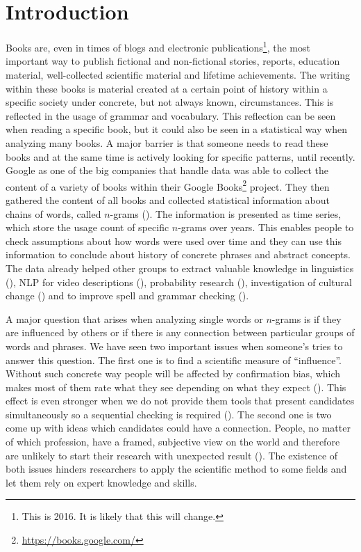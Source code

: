 \chapter{Introduction}
\label{ch:Introduction}

Books are, even in times of blogs and electronic publications\footnote{This is 2016. It is likely that this will change.}, the most important way to publish fictional and non-fictional stories, reports, education material, well-collected scientific material and lifetime achievements. The writing within these books is material created at a certain point of history within a specific society under concrete, but not always known, circumstances. This is reflected in the usage of grammar and vocabulary. This reflection can be seen when reading a specific book, but it could also be seen in a statistical way when analyzing many books. A major barrier is that someone needs to read these books and at the same time is actively looking for specific patterns, until recently. Google as one of the big companies that handle data was able to collect the content of a variety of books within their Google Books\footnote{\url{https://books.google.com/}} project. They then gathered the content of all books and collected statistical information about chains of words, called $n$-grams (\cite{Google_nGrams}). The information is presented as time series, which store the usage count of specific $n$-grams over years. This enables people to check assumptions about how words were used over time and they can use this information to conclude about history of concrete phrases and abstract concepts. The data already helped other groups to extract valuable knowledge in linguistics (\cite{others1,others5,others7}), NLP for video descriptions (\cite{others2}), probability research (\cite{others3,others6}), investigation of cultural change (\cite{others4}) and to improve spell and grammar checking (\cite{languagetool}).

A major question that arises when analyzing single words or $n$-grams is if they are influenced by others or if there is any connection between particular groups of words and phrases. We have seen two important issues when someone's tries to answer this question. The first one is to find a scientific measure of \enquote{influence}. Without such concrete way people will be affected by confirmation bias, which makes most of them rate what they see depending on what they expect (\cite{cbias1,cbias2}). This effect is even stronger when we do not provide them tools that present candidates simultaneously so a sequential checking is required (\cite{cbias3}). The second one is two come up with ideas which candidates could have a connection. People, no matter of which profession, have a framed, subjective view on the world and therefore are unlikely to start their research with unexpected result (\cite{framing1,framing2}). The existence of both issues hinders researchers to apply the scientific method to some fields and let them rely on expert knowledge and skills.

